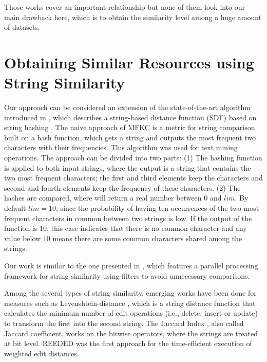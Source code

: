 Those works cover an important relationship but none of them look into our main drawback here, which is to obtain the similarity level among a huge amount of datasets.

\section{Obtaining Similar Resources using String Similarity}
Our approach can be considered an extension of the state-of-the-art algorithm introduced in \cite{seker2014novel}, %
which describes a string-based distance function (SDF) based on string hashing \cite{seker2013novel,rivest1992md5}.
The naive approach of MFKC \cite{seker2014novel} is a metric for string comparison built on a hash function, which gets a string and outputs the most frequent two characters with their frequencies. 
This algorithm was used for text mining operations.
The approach can be divided into two parts: 
(1) The hashing function is applied to both input strings, where the output is a string that contains the two most frequent characters;
the first and third elements keep the characters and second and fourth elements keep the frequency of these characters. 
(2) The hashes are compared, where will return a real number between $0$ and $lim$.
By default $lim=10$, since the probability of having ten occurrences of the two most frequent characters in common between two strings is low. 
If the output of the function is $10$, this case indicates that there is no common character and any value below $10$ means there are some common characters shared among the strings.

Our work is similar to the one presented in \cite{10.1371/journal.pone.0172526}, which features a parallel processing framework for string similarity using filters to avoid unnecessary comparisons. 

Among the several types of string similarity, emerging works have been done for measures such as Levenshtein-distance \cite{levenshtein1966binary}, which is a string distance function that calculates the minimum number of edit operations (i.e., delete, insert or update) to transform the first into the second string. 
The Jaccard Index \cite{jaccard1912distribution}, also called Jaccard coefficient, works on the bitwise operators, where the strings are treated at bit level. 
REEDED \cite{soru2013rapid} was the first approach for the time-efficient execution of weighted edit distances. 

